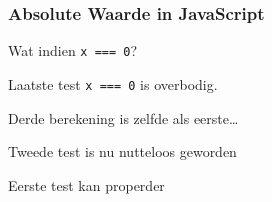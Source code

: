 \documentclass{../khlslides}
\begin{document}
\begin{frame}
  \frametitle{Absolute Waarde in JavaScript}
  \begin{overprint}





  \end{overprint}

  \begin{overprint}
    \begin{center}
      Wat indien {\tt x === 0}?
    \end{center}

    \begin{center}
      Laatste test {\tt x === 0} is overbodig.
    \end{center}

    \begin{center}
      Derde berekening is zelfde als eerste\dots
    \end{center}

    \begin{center}
      Tweede test is nu nutteloos geworden
    \end{center}

    \begin{center}
      Eerste test kan properder
    \end{center}
  \end{overprint}
\end{frame}
\end{document}
